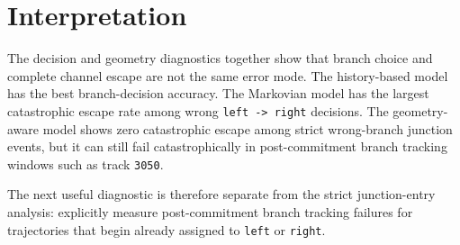 \documentclass[11pt]{article}
\begin{document}
\section{Interpretation}

The decision and geometry diagnostics together show that branch choice and
complete channel escape are not the same error mode.  The history-based model
has the best branch-decision accuracy.  The Markovian model has the largest
catastrophic escape rate among wrong \texttt{left -> right} decisions.  The
geometry-aware model shows zero catastrophic escape among strict wrong-branch
junction events, but it can still fail catastrophically in post-commitment branch
tracking windows such as track \texttt{3050}.

The next useful diagnostic is therefore separate from the strict junction-entry
analysis: explicitly measure post-commitment branch tracking failures for
trajectories that begin already assigned to \texttt{left} or \texttt{right}.
\end{document}
